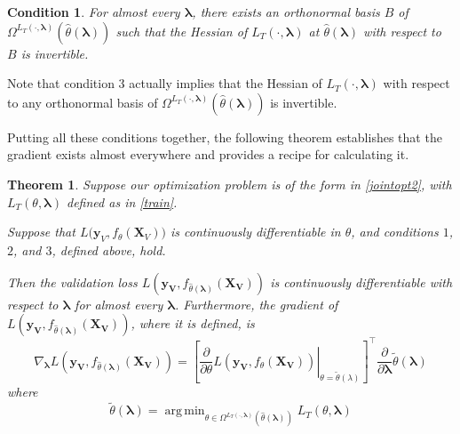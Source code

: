 \documentclass[10pt,letterpaper]{article}
\newtheorem{theorem}{Theorem}
\newtheorem{condition}{Condition}
\DeclareMathOperator*{\argmin}{arg\,min}
\begin{document}
\begin{condition}
For almost every $\boldsymbol{\lambda}$, there exists an orthonormal basis $B$ of $\Omega^{L_T(\cdot, \boldsymbol{\lambda})}(\hat{\theta}\left(\boldsymbol{\lambda}\right))$ such that the Hessian of $L_T\left(\cdot, \boldsymbol{\lambda}\right)$ at $\hat{\theta}\left(\boldsymbol{\lambda}\right)$ with respect to $B$ is invertible.

\end{condition}
Note that condition 3 actually implies that the Hessian of $L_T \left(\cdot, \boldsymbol{\lambda}\right)$ with respect to any orthonormal basis of $\Omega^{L_T(\cdot, \boldsymbol{\lambda})}(\hat{\theta}\left(\boldsymbol{\lambda}\right))$ is invertible.

Putting all these conditions together, the following theorem establishes that the gradient exists almost everywhere and provides a recipe for calculating it.

\begin{theorem}
Suppose our optimization problem is of the form in \eqref{jointopt2}, with $L_T\left(\theta, \boldsymbol{\lambda}\right)$ defined as in \eqref{train}.

Suppose that $L \Big( \boldsymbol{y}_V, f_{\theta}(\boldsymbol{X}_V)\Big)$ is continuously differentiable in $\theta$, and conditions $1$, $2$, and $3$, defined above, hold.

Then the validation loss $L(\boldsymbol{y_V}, f_{\hat \theta(\boldsymbol{\lambda})}(\boldsymbol{X_V}))$ is continuously differentiable with respect to $\boldsymbol{\lambda}$ for almost every $\boldsymbol{\lambda}$. Furthermore, the gradient of $L(\boldsymbol{y_V}, f_{\hat \theta(\boldsymbol{\lambda})}(\boldsymbol{X_V}))$, where it is defined, is
\begin{equation}
\nabla_{\boldsymbol{\lambda}} L \left ( \boldsymbol{y_V}, f_{\hat \theta(\boldsymbol{\lambda})}(\boldsymbol{X_V}) \right) =
\left [ \left .
\frac{\partial}{\partial \theta} L(\boldsymbol{y_V}, f_{\theta}(\boldsymbol{X_V}))
\right |_{\theta=\tilde\theta(\lambda)} \right ]^\top
\frac{\partial}{\partial \boldsymbol{\lambda}} \tilde{\theta}(\boldsymbol{\lambda})
\end{equation}
where
\begin{equation}
\tilde{\theta}(\boldsymbol{\lambda}) = \argmin_{\theta \in \Omega^{L_T(\cdot, \boldsymbol{\lambda})}(\hat \theta(\boldsymbol{\lambda}))} L_T(\theta , \boldsymbol{\lambda})
\label{restrictedmodelparams}
\end{equation}
\label{thethrm}
\end{theorem}
\end{document}
